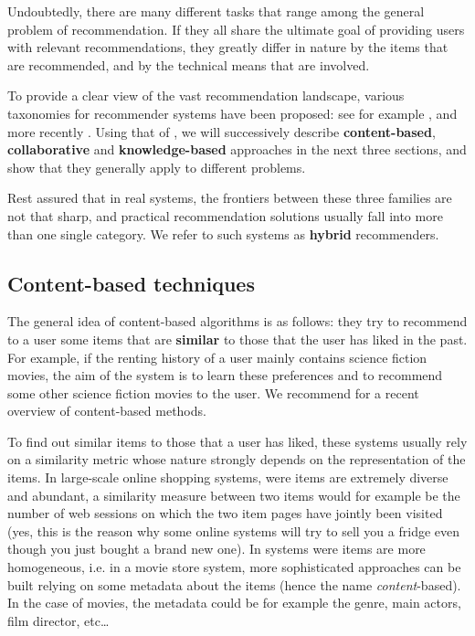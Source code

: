 Undoubtedly, there are many different tasks that range among the general problem
of recommendation. If they all share the ultimate goal of providing users with
relevant recommendations, they greatly differ in nature by the items that are
recommended, and by the technical means that are involved.

To provide a clear view of the vast recommendation landscape, various taxonomies
for recommender systems have been proposed: see for example \cite{Bur02,
AdoTuzIEEE2005, Bur07}, and more recently \cite{BurRam11}. Using that of
\cite{BurRam11}, we will successively describe \textbf{content-based},
\textbf{collaborative} and \textbf{knowledge-based} approaches in the next
three sections, and show that they generally apply to different problems.

Rest assured that in real systems, the frontiers between these three families
are not that sharp, and practical recommendation solutions usually fall into
more than one single category. We refer to such systems as \textbf{hybrid}
recommenders.

\subsection{Content-based techniques}

The general idea of content-based algorithms is as follows: they try to recommend to a user some items that are
\textbf{similar} to those that the user has liked in the past. For example, if
the renting history of a user mainly contains science fiction movies, the aim
of the system is to learn these preferences and to recommend some other science
fiction movies to the user. We recommend \cite{LopGemSem11} for a recent
overview of content-based methods.

To find out similar items to those that a user has liked, these systems usually
rely on a similarity metric whose nature strongly depends on the representation
of the items. In large-scale online shopping systems, were items are extremely
diverse and abundant, a similarity measure between two items would for
example be the number of web sessions on which the two item pages have jointly
been visited (yes, this is the reason why some online systems will try to sell
you a fridge even though you just bought a brand new one). In systems were
items are more homogeneous, i.e. in a movie store system, more  sophisticated
approaches can be built relying on some metadata about the items (hence the
name \textit{content}-based). In the case of movies, the metadata could be for
example the genre, main actors, film director, etc\dots

